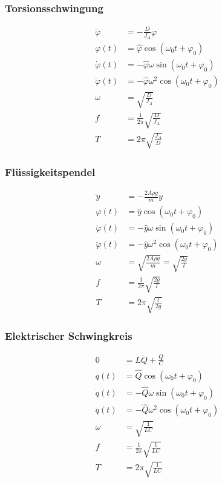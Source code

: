 \begin{multicols}{2}{}
\subsubsection{Torsionsschwingung}
\begin{align*}
\ddot{\varphi}&=-\frac{D}{J_A}\varphi\\
\varphi(t)&=\hat{\varphi}\cos(\omega_0 t+\varphi_0)\\
\dot{\varphi}(t)&=-\hat{\varphi}\omega\sin(\omega_0 t+\varphi_0)\\
\ddot{\varphi}(t)&=-\hat{\varphi}\omega^2\cos(\omega_0 t+\varphi_0)\\
\omega&=\sqrt{\frac{D}{J_A}}\\
f&=\frac{1}{2\pi}\sqrt{\frac{D}{J_A}}\\
T&=2\pi\sqrt{\frac{J_A}{D}}
\end{align*}



\subsubsection{Flüssigkeitspendel}
\begin{align*}
\ddot{y}&=-\frac{2A\rho g}{m}y\\
\varphi(t)&=\hat{y}\cos(\omega_0 t+\varphi_0)\\
\dot{\varphi}(t)&=-\hat{y}\omega\sin(\omega_0 t+\varphi_0)\\
\ddot{\varphi}(t)&=-\hat{y}\omega^2\cos(\omega_0 t+\varphi_0)\\
\omega&=\sqrt{\frac{2A\rho g}{m}}=\sqrt{\frac{2g}{l}}\\
f&=\frac{1}{2\pi}\sqrt{\frac{2g}{l}}\\
T&=2\pi\sqrt{\frac{l}{2g}}
\end{align*}
\end{multicols}

\begin{multicols}{2}
\subsubsection{Elektrischer Schwingkreis}
\begin{align*}
0&=L\ddot{Q}+\frac{Q}{C}\\
q(t)&=\hat{Q}\cos(\omega_0 t+\varphi_0)\\
\dot{q}(t)&=-\hat{Q}\omega\sin(\omega_0 t+\varphi_0)\\
\ddot{q}(t)&=-\hat{Q}\omega^2\cos(\omega_0 t+\varphi_0)\\
\omega&=\sqrt{\frac{1}{LC}}\\
f&=\frac{1}{2\pi}\sqrt{\frac{1}{LC}}\\
T&=2\pi\sqrt{\frac{1}{LC}}
\end{align*}
\vfill
\end{multicols}


